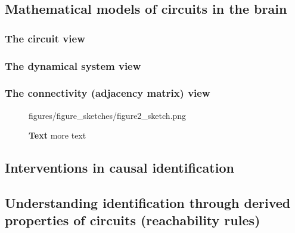 
\subsection{Mathematical models of circuits in the brain}

\subsubsection{The circuit view}
\subsubsection{The dynamical system view}
\subsubsection{The connectivity (adjacency matrix) view}

\begin{figure}[ht]
	\centering
	 \begin{overpic}[width=.6\textwidth]{figures/figure_sketches/figure2_sketch.png}
	  \end{overpic}
    \caption{\textbf{Text} more text}
    \label{fig:methods} %
 \end{figure}

\subsection{Interventions in causal identification}

\subsection{Understanding identification through derived properties of circuits (reachability rules)}
